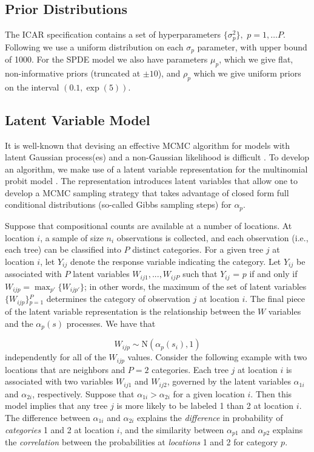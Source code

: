 \documentclass[12pt]{article}\usepackage[]{graphicx}\usepackage[]{color}
\begin{document}
\subsection{Prior Distributions}

\noindent The ICAR specification contains a set of hyperparameters
$\{\sigma_{p}^{2}\},$ $p=1,\ldots P$. Following \cite{Gelm:2006}
we use a uniform distribution on each $\sigma_{p}$ parameter, with
upper bound of 1000. For the SPDE model we also have parameters $\mu_{p}$,
which we give flat, non-informative priors (truncated at $\pm10$),
and $\rho_{p}$ which we give uniform priors on the interval $(0.1,\exp(5))$. 


\subsection{Latent Variable Model\label{sub:Latent-Variable-Model}}

It is well-known that devising an effective MCMC algorithm for models
with latent Gaussian process(es) and a non-Gaussian likelihood is
difficult \citep{Rue:Held:2005,Chri:etal:2006,Tan:Nott:2013}. To
develop an algorithm, we make use of a latent variable representation
for the multinomial probit model \citep{McCu:Ross:1994}. The representation
introduces latent variables that allow one to develop a MCMC sampling
strategy that takes advantage of closed form full conditional distributions
(so-called Gibbs sampling steps) for $\alpha_{p}$.

Suppose that compositional counts are available at a number of locations.
At location $i$, a sample of size $n_{i}$ observations is collected,
and each observation (i.e., each tree) can be classified into $P$
distinct categories. For a given tree $j$ at location $i$, let $Y_{ij}$
denote the response variable indicating the category. Let $Y_{ij}$
be associated with $P$ latent variables $W_{ij1},...,W_{ijP}$ such
that $Y_{ij}$ = $p$ if and only if $W_{ijp}={\displaystyle \max_{p'}\big\{ W_{ijp'}\big\}}$;
in other words, the maximum of the set of latent variables $\{W_{ijp}\}{\displaystyle _{p=1}^{P}}$
determines the category of observation $j$ at location $i$. The
final piece of the latent variable representation is the relationship
between the $W$ variables and the $\alpha_{p}(s)$ processes. We
have that

\noindent 
\[
W_{ijp}\sim\mbox{N}(\alpha_{p}(s_{i}),1)
\]
independently for all of the $W_{ijp}$ values. Consider the following
example with two locations that are neighbors and $P=2$ categories.
Each tree $j$ at location $i$ is associated with two variables $W_{ij1}$
and $W_{ij2}$, governed by the latent variables $\alpha_{1i}$ and
$\alpha_{2i}$, respectively. Suppose that $\alpha_{1i}>\alpha_{2i}$
for a given location $i$. Then this model implies that any tree $j$
is more likely to be labeled 1 than 2 at location $i$. The difference
between $\alpha_{1i}$ and $\alpha_{2i}$ explains the \textit{difference}
in probability of \textit{categories} 1 and 2 at location $i$, and
the similarity between $\alpha_{p1}$ and $\alpha_{p2}$ explains
the \textit{correlation} between the probabilities at \textit{locations}
1 and 2 for category $p$.
\end{document}
